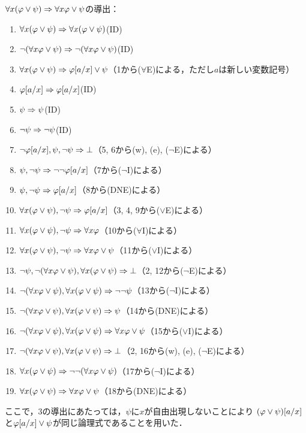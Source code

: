 \(\forall x \paren{\varphi \lor \psi} \sequent \forall x \varphi \lor \psi\)の導出：
\begin{enumerate}
	\item \(\forall x \paren{\varphi \lor \psi} \sequent \forall x \paren{\varphi \lor \psi}\)\quad (ID)
	\item \(\lnot \paren{\forall x \varphi \lor \psi} \sequent \lnot \paren{\forall x \varphi \lor \psi}\)\quad (ID)
	\item \(\forall x \paren{\varphi \lor \psi} \sequent \subst{\varphi}{a/x} \lor \psi\)\quad （1から(\(\forall\)E)による，ただし\(a\)は新しい変数記号）
	\item \(\subst{\varphi}{a/x} \sequent \subst{\varphi}{a/x}\)\quad (ID)
	\item \(\psi \Rightarrow \psi\)\quad (ID)
	\item \(\lnot \psi \Rightarrow \lnot \psi\)\quad (ID)
	\item \(\lnot \subst{\varphi}{a/x}, \psi, \lnot \psi \sequent \bot\)\quad （5, 6から(w), (e), (\(\lnot\)E)による）
	\item \(\psi, \lnot \psi \sequent \lnot \lnot \subst{\varphi}{a/x}\)\quad （7から(\(\lnot\)I)による）
	\item \(\psi, \lnot \psi \sequent \subst{\varphi}{a/x}\)\quad （8から(DNE)による）
	\item \(\forall x \paren{\varphi \lor \psi}, \lnot \psi \sequent \subst{\varphi}{a/x}\)\quad （3, 4, 9から(\(\lor\)E)による）
	\item \(\forall x \paren{\varphi \lor \psi}, \lnot \psi \sequent \forall x \varphi\)\quad （10から(\(\forall\)I)による）
	\item \(\forall x \paren{\varphi \lor \psi}, \lnot \psi \sequent \forall x \varphi \lor \psi\)\quad （11から(\(\lor\)I)による）
	\item \(\lnot \psi, \lnot \paren{\forall x \varphi \lor \psi}, \forall x \paren{\varphi \lor \psi} \sequent \bot\)\quad （2, 12から(\(\lnot\)E)による）
	\item \(\lnot \paren{\forall x \varphi \lor \psi}, \forall x \paren{\varphi \lor \psi} \sequent \lnot \lnot \psi\)\quad （13から(\(\lnot\)I)による）
	\item \(\lnot \paren{\forall x \varphi \lor \psi}, \forall x \paren{\varphi \lor \psi} \sequent \psi\)\quad （14から(DNE)による）
	\item \(\lnot \paren{\forall x \varphi \lor \psi}, \forall x \paren{\varphi \lor \psi} \sequent \forall x \varphi \lor \psi\)\quad （15から(\(\lor\)I)による）
	\item \(\lnot \paren{\forall x \varphi \lor \psi}, \forall x \paren{\varphi \lor \psi} \sequent \bot\)\quad （2, 16から(w), (e), (\(\lnot\)E)による）
	\item \(\forall x \paren{\varphi \lor \psi} \sequent \lnot \lnot \paren{\forall x \varphi \lor \psi}\)\quad （17から(\(\lnot\)I)による）
	\item \(\forall x \paren{\varphi \lor \psi} \sequent \forall x \varphi \lor \psi\)\quad （18から(DNE)による）
\end{enumerate}
ここで，3の導出にあたっては，\(\psi\)に\(x\)が自由出現しないことにより
\(\subst{\paren{\varphi \lor \psi}}{a/x}\)と\(\subst{\varphi}{a/x} \lor \psi\)が同じ論理式であることを用いた．

